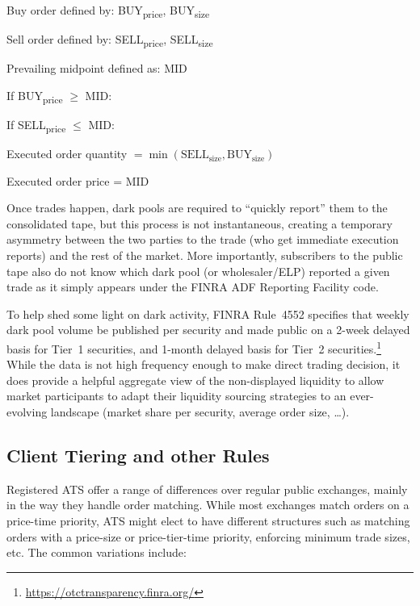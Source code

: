 \noindent Buy order defined by: BUY\textsubscript{price}, BUY\textsubscript{size} \par
\noindent Sell order defined by: SELL\textsubscript{price}, SELL\textsubscript{size}  \par
\noindent Prevailing midpoint defined as: MID \twomedskip

\noindent If BUY\textsubscript{price} $\geq$ MID: \par
\indent If SELL\textsubscript{price} $\leq$ MID: \par
\indent\indent Executed order quantity $= \min(\text{SELL}_{\text{size}}, \text{BUY}_{\text{size}})$ \par
\indent\indent Executed order price = MID \twomedskip


Once trades happen, dark pools are required to ``quickly report'' them to the consolidated tape, but this process is not instantaneous, creating a temporary asymmetry between the two parties to the trade (who get immediate execution reports) and the rest of the market. More importantly, subscribers to the public tape also do not know which dark pool (or wholesaler/ELP) reported a given trade as it simply appears under the FINRA ADF Reporting Facility code.


To help shed some light on dark activity, FINRA Rule~4552 specifies that weekly dark pool volume be published per security and made public on a 2-week delayed basis for Tier~1 securities, and 1-month delayed basis for Tier~2 securities.\footnote{\url{https://otctransparency.finra.org/}} While the data is not high frequency enough to make direct trading decision, it does provide a helpful aggregate view of the non-displayed liquidity to allow market participants to adapt their liquidity sourcing strategies to an ever-evolving landscape (market share per security, average order size, \dots).


\subsection{Client Tiering and other Rules\label{sec:client_tier}}

Registered ATS offer a range of differences over regular public exchanges, mainly in the way they handle order matching. While most exchanges match orders on a price-time priority, ATS might elect to have different structures such as matching orders with a price-size or price-tier-time priority, enforcing minimum trade sizes, etc. The common variations include:


